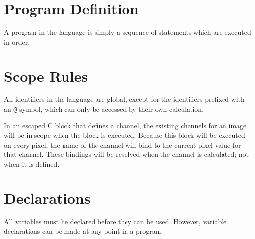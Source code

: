 \section{Program Definition}
A program in the \sys{} language is simply a sequence of statements which
are executed in order.

\section{Scope Rules}
All identifiers in the \sys{} language are global, except for the
identifiers prefixed with an \texttt{@} symbol, which can only be
accessed by their own calculation.

In an escaped C block that defines a channel, the existing channels
for an image will be in scope when the block is executed. Because
this block will be executed on every pixel, the name of the channel
will bind to the current pixel value for that channel. These bindings
will be resolved when the channel is calculated; not when it is
defined.

\section{Declarations}
All variables must be declared before they can be used. However,
variable declarations can be made at any point in a program.

